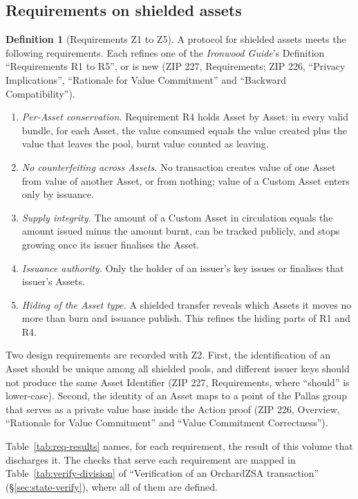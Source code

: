 \documentclass[11pt,a4paper]{article}
\theoremstyle{definition}
\newtheorem{definition}[theorem]{Definition}
\begin{document}
\subsection{Requirements on shielded assets}\label{sec:intro-req}

\begin{definition}[Requirements Z1 to Z5]\label{def:req-zsa}
A protocol for shielded assets meets the following requirements. Each
refines one of the \emph{Ironwood Guide}'s Definition ``Requirements R1 to
R5'', or is new (ZIP 227, Requirements; ZIP 226, ``Privacy Implications'',
``Rationale for Value Commitment'' and ``Backward Compatibility'').
\begin{enumerate}[label=Z\arabic*., leftmargin=2.4em]
\item \emph{Per-Asset conservation.} Requirement R4 holds Asset by Asset:
  in every valid bundle, for each Asset, the value consumed equals the value
  created plus the value that leaves the pool, burnt value counted as
  leaving.
\item \emph{No counterfeiting across Assets.} No transaction creates value
  of one Asset from value of another Asset, or from nothing; value of a
  Custom Asset enters only by issuance.
\item \emph{Supply integrity.} The amount of a Custom Asset in circulation
  equals the amount issued minus the amount burnt, can be tracked publicly,
  and stops growing once its issuer finalises the Asset.
\item \emph{Issuance authority.} Only the holder of an issuer's key issues
  or finalises that issuer's Assets.
\item \emph{Hiding of the Asset type.} A shielded transfer reveals which
  Assets it moves no more than burn and issuance publish. This refines the
  hiding parts of R1 and R4.
\end{enumerate}
Two design requirements are recorded with Z2. First, the identification of
an Asset should be unique among all shielded pools, and different issuer
keys should not produce the same Asset Identifier (ZIP 227, Requirements,
where ``should'' is lower-case). Second, the identity of an Asset maps to a
point of the Pallas group that serves as a private value base inside the
Action proof (ZIP 226, Overview, ``Rationale for Value Commitment'' and
``Value Commitment Correctness'').
\end{definition}

Table~\ref{tab:req-results} names, for each requirement, the result of this
volume that discharges it. The checks that serve each requirement are mapped
in Table~\ref{tab:verify-division} of ``Verification of an OrchardZSA
transaction'' (\S\ref{sec:state-verify}), where all of them are defined.
\end{document}
